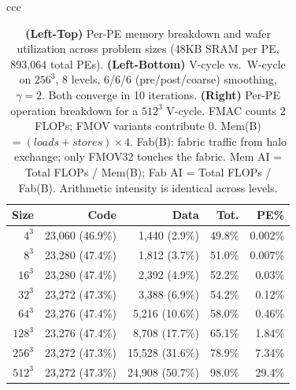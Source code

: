 \documentclass[conference]{IEEEtran}
\begin{document}
\begin{table}[t]
    \caption{%
        \textbf{(Left-Top)} Per-PE memory breakdown and wafer utilization across problem sizes (48KB SRAM per PE, 893,064 total PEs).
        \textbf{(Left-Bottom)} V-cycle vs.\ W-cycle on $256^3$, 8 levels, 6/6/6 (pre/post/coarse) smoothing, $\gamma=2$. Both converge in 10 iterations.
        \textbf{(Right)} Per-PE operation breakdown for a $512^3$ V-cycle. FMAC counts 2 FLOPs; FMOV variants contribute 0.
        Mem(B)${}=(loads{+}stores){\times}4$. Fab(B): fabric traffic from halo exchange; only FMOV32 touches the fabric.
        Mem AI = Total FLOPs / Mem(B); Fab AI = Total FLOPs / Fab(B). Arithmetic intensity is identical across levels.}
    
    \label{tab:memory_utilization}
    \label{tab:roofline_ops}
    \label{tab:vcycle_vs_wcycle}
    \footnotesize
    \noindent
    \begin{tabular}{ccc}
    \begin{minipage}[t]{0.30\textwidth}
    \vspace{0pt}
        \centering
        \setlength{\tabcolsep}{1.5pt}
        \begin{tabular}{|r||r|r|r|r|} \hline
            \textbf{Size} & \textbf{Code} & \textbf{Data} & \textbf{Tot.} & \textbf{PE\%} \\ \hline \hline
            $4^3$   & 23,060 (46.9\%) & 1,440 (2.9\%)   & 49.8\% & 0.002\% \\ \hline
            $8^3$   & 23,280 (47.4\%) & 1,812 (3.7\%)   & 51.0\% & 0.007\% \\ \hline
            $16^3$  & 23,280 (47.4\%) & 2,392 (4.9\%)   & 52.2\% & 0.03\%  \\ \hline
            $32^3$  & 23,272 (47.3\%) & 3,388 (6.9\%)   & 54.2\% & 0.12\%  \\ \hline
            $64^3$  & 23,276 (47.4\%) & 5,216 (10.6\%)  & 58.0\% & 0.46\%  \\ \hline
            $128^3$ & 23,276 (47.4\%) & 8,708 (17.7\%)  & 65.1\% & 1.84\%  \\ \hline
            $256^3$ & 23,272 (47.3\%) & 15,528 (31.6\%) & 78.9\% & 7.34\%  \\ \hline
            $512^3$ & 23,272 (47.3\%) & 24,908 (50.7\%) & 98.0\% & 29.4\%  \\ \hline
        \end{tabular}


\end{minipage}
\end{tabular}
\end{table}
\end{document}
